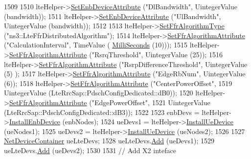 \begin{DoxyCode}
1509 
1510   lteHelper->\hyperlink{classns3_1_1LteHelper_ac42f0f3d6cd8473d810bfbbeb5d592e0}{SetEnbDeviceAttribute} (\textcolor{stringliteral}{"DlBandwidth"}, UintegerValue (bandwidth));
1511   lteHelper->\hyperlink{classns3_1_1LteHelper_ac42f0f3d6cd8473d810bfbbeb5d592e0}{SetEnbDeviceAttribute} (\textcolor{stringliteral}{"UlBandwidth"}, UintegerValue (bandwidth));
1512 
1513   lteHelper->\hyperlink{classns3_1_1LteHelper_a035c6b03305c1511975362f80425b5fc}{SetFfrAlgorithmType} (\textcolor{stringliteral}{"ns3::LteFfrDistributedAlgorithm"});
1514   lteHelper->\hyperlink{classns3_1_1LteHelper_a793d56e843a844428851e90752c5f130}{SetFfrAlgorithmAttribute} (\textcolor{stringliteral}{"CalculationInterval"}, TimeValue (
      \hyperlink{group__timecivil_gaf26127cf4571146b83a92ee18679c7a9}{MilliSeconds} (10)));
1515   lteHelper->\hyperlink{classns3_1_1LteHelper_a793d56e843a844428851e90752c5f130}{SetFfrAlgorithmAttribute} (\textcolor{stringliteral}{"RsrqThreshold"}, UintegerValue (25));
1516   lteHelper->\hyperlink{classns3_1_1LteHelper_a793d56e843a844428851e90752c5f130}{SetFfrAlgorithmAttribute} (\textcolor{stringliteral}{"RsrpDifferenceThreshold"}, UintegerValue (5)
      );
1517   lteHelper->\hyperlink{classns3_1_1LteHelper_a793d56e843a844428851e90752c5f130}{SetFfrAlgorithmAttribute} (\textcolor{stringliteral}{"EdgeRbNum"}, UintegerValue (6));
1518   lteHelper->\hyperlink{classns3_1_1LteHelper_a793d56e843a844428851e90752c5f130}{SetFfrAlgorithmAttribute} (\textcolor{stringliteral}{"CenterPowerOffset"},
1519                                        UintegerValue (LteRrcSap::PdschConfigDedicated::dB0));
1520   lteHelper->\hyperlink{classns3_1_1LteHelper_a793d56e843a844428851e90752c5f130}{SetFfrAlgorithmAttribute} (\textcolor{stringliteral}{"EdgePowerOffset"},
1521                                        UintegerValue (LteRrcSap::PdschConfigDedicated::dB3));
1522 
1523   enbDevs = lteHelper->\hyperlink{classns3_1_1LteHelper_a5e009ad35ef85f46b5a6099263f15a03}{InstallEnbDevice} (enbNodes);
1524   ueDevs1 = lteHelper->\hyperlink{classns3_1_1LteHelper_ac9cd932d7de92811cfa953c2e3b2fc9f}{InstallUeDevice} (ueNodes1);
1525   ueDevs2 = lteHelper->\hyperlink{classns3_1_1LteHelper_ac9cd932d7de92811cfa953c2e3b2fc9f}{InstallUeDevice} (ueNodes2);
1526 
1527   \hyperlink{classns3_1_1NetDeviceContainer}{NetDeviceContainer} ueLteDevs;
1528   ueLteDevs.\hyperlink{classns3_1_1NetDeviceContainer_a7ca8bc1d7ec00fd4fcc63869987fbda5}{Add} (ueDevs1);
1529   ueLteDevs.\hyperlink{classns3_1_1NetDeviceContainer_a7ca8bc1d7ec00fd4fcc63869987fbda5}{Add} (ueDevs2);
1530 
1531   \textcolor{comment}{// Add X2 inteface}

\end{DoxyCode}
